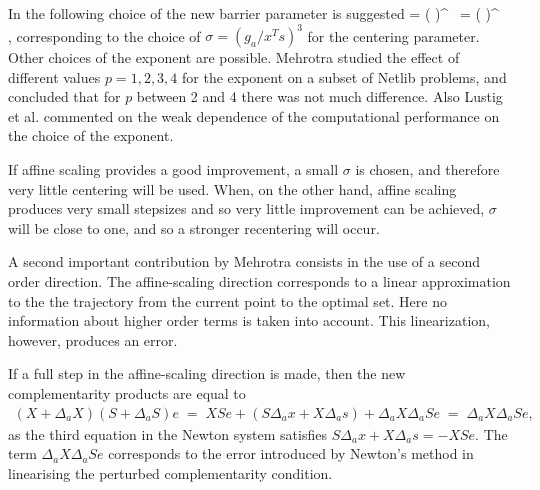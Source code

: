 In \cite{Mehrotra92} the following choice of the new barrier parameter 
is suggested
%
\be \label{eq:Mu}
  \mu = \left(  \right)^{} \, 
           = \left(  \right)^{} \, ,
\ee
%
corresponding to the choice of $\sigma = (g_a / x^Ts)^3$ 
for the centering parameter. 
Other choices of the exponent are possible. Mehrotra \cite{Mehrotra92}
studied the effect of different values $p=1,2,3,4$ for the exponent
on a subset of Netlib problems, and concluded that for $p$ between
2 and 4 there was not much difference.
Also Lustig et al. \cite{LustigMarstenShanno} commented on the
weak dependence of the computational performance on the choice 
of the exponent.



If affine scaling provides a good improvement, a small $\sigma$ 
is chosen, and therefore very little centering will be used. When, 
on the other hand, affine scaling produces very small stepsizes 
and so very little improvement can be achieved, $\sigma$ will be 
close to one, and so a stronger recentering will occur.


A second important contribution by Mehrotra consists in the 
use of a second order direction. The affine-scaling direction 
corresponds to a linear approximation to the the trajectory from 
the current point to the optimal set. Here no information about 
higher order terms is taken into account. This linearization, 
however, produces an error.


If a full step in the affine-scaling direction is made, then 
the new complementarity products are equal to
%
\begin{eqnarray*}
  (X + \Delta_a X) (S + \Delta_a S) e 
   \;=\; XSe + (S \Delta_a x + X \Delta_a s) + \Delta_a X \Delta_a S e
   \;=\; \Delta_a X \Delta_a S e,
\end{eqnarray*}
%
as the third equation in the Newton system satisfies 
$S \Delta_a x + X \Delta_a s = -XSe.$
%
The term $\Delta_a X \Delta_a S e$ corresponds to the error introduced
by Newton's method in linearising the perturbed complementarity condition.


